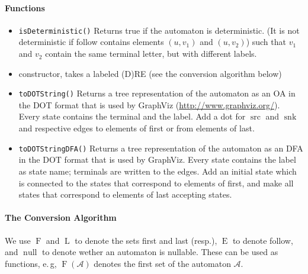 \documentclass[a4paper,11pt, svgnames,titlepage]{article}
\DeclareMathOperator{\src}{src}
\DeclareMathOperator{\snk}{snk}
\DeclareMathOperator{\first}{F}
\DeclareMathOperator{\last}{L}
\DeclareMathOperator{\follow}{E}
\DeclareMathOperator{\nullable}{null}
\begin{document}
\paragraph{Functions}
\begin{itemize}
	\item\texttt{isDeterministic()} Returns true if the automaton is deterministic. (It is not deterministic if follow contains elements $(u,v_1)$ and $(u,v_2)$) such that $v_1$ and $v_2$ contain the same terminal letter, but with different labels.
	\item constructor, takes a labeled (D)RE (see the conversion algorithm below)
	\item\texttt{toDOTString()} Returns a tree representation of the automaton as an OA in the DOT format that is used by GraphViz  (\url{http://www.graphviz.org/}). Every state contains the terminal and the label. Add a dot for $\src$ and $\snk$ and respective edges to elements of first or from elements of last.
	\item\texttt{toDOTStringDFA()} Returns a tree representation of the automaton as an DFA in the DOT format that is used by GraphViz. Every state contains the label as state name; terminals are written to the edges. Add an initial state which is connected to the states that correspond to elements of first, and make all states that correspond to elements of last accepting states.
\end{itemize}
\paragraph{The Conversion Algorithm}
We use $\first$ and $\last$ to denote the sets first and last (resp.), $\follow$ to denote follow, and $\nullable$ to denote wether an automaton is nullable. These can be used as functions, e.\,g, $\first(\mathcal{A})$ denotes the first set of the automaton $\mathcal{A}$.
\end{document}
